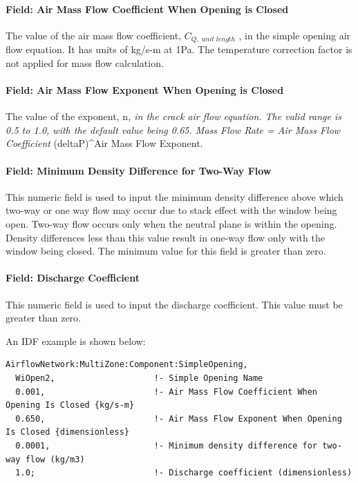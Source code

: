 \paragraph{Field: Air Mass Flow Coefficient When Opening is Closed}\label{field-air-mass-flow-coefficient-when-opening-is-closed-2}

The value of the air mass flow coefficient, \({C_{Q,\;unit\;length}}\) , in the simple opening air flow equation. It has units of kg/s-m at 1Pa. The temperature correction factor is not applied for mass flow calculation.

\paragraph{Field: Air Mass Flow Exponent When Opening is Closed}\label{field-air-mass-flow-exponent-when-opening-is-closed-2}

The value of the exponent, n\emph{, in the crack air flow equation. The valid range is 0.5 to 1.0, with the default value being 0.65. Mass Flow Rate = Air Mass Flow Coefficient} (deltaP)\^{}Air Mass Flow Exponent.

\paragraph{Field: Minimum Density Difference for Two-Way Flow}\label{field-minimum-density-difference-for-two-way-flow}

This numeric field is used to input the minimum density difference above which two-way or one way flow may occur due to stack effect with the window being open. Two-way flow occurs only when the neutral plane is within the opening. Density differences less than this value result in one-way flow only with the window being closed. The minimum value for this field is greater than zero.

\paragraph{Field: Discharge Coefficient}\label{field-discharge-coefficient-2}

This numeric field is used to input the discharge coefficient. This value must be greater than zero.

An IDF example is shown below:

\begin{lstlisting}
AirflowNetwork:MultiZone:Component:SimpleOpening,
  WiOpen2,                    !- Simple Opening Name
  0.001,                      !- Air Mass Flow Coefficient When Opening Is Closed {kg/s-m}
  0.650,                      !- Air Mass Flow Exponent When Opening Is Closed {dimensionless}
  0.0001,                     !- Minimum density difference for two-way flow (kg/m3)
  1.0;                        !- Discharge coefficient (dimensionless)
\end{lstlisting}

